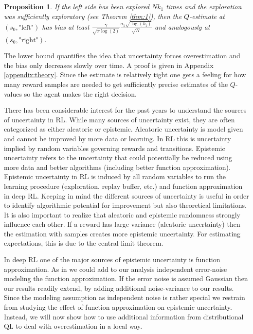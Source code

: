 \documentclass{article}
\theoremstyle{plain}
\newtheorem{proposition}[theorem]{Proposition}
\theoremstyle{definition}
\theoremstyle{remark}
\begin{document}
\begin{proposition}\label{prop2}
If the left side has been explored $Nk_1$ times and the exploration was sufficiently exploratory (see Theorem \ref{thm:1}), then the $Q$-estimate at $(s_0,\text{"left"})$ has bias at least $\frac{\gamma}{\sqrt{\pi\log(2) }}\frac{\sigma_1 \sqrt{\log(k_1)}}{\sqrt{N}}$ and analogously at $(s_0,\text{"right"})$.
\end{proposition}
 The lower bound quantifies the idea that uncertainty forces overestimation and the bias only decreases slowly over time. A proof is given in Appendix \ref{appendix:theory}. Since the estimate is relatively tight one gets a feeling for how many reward samples are needed to get sufficiently precise estimates of the $Q$-values so the agent makes the right decision.

There has been considerable interest for the past years to understand the sources of uncertainty in RL. While many sources of uncertainty exist, they are often categorized as either aleatoric or epistemic. Aleatoric uncertainty is model given and cannot be improved by more data or learning. In RL this is uncertainty implied by random variables governing rewards and transitions. Epistemic uncertainty refers to the uncertainty that could potentially be reduced using more data and better algorithms (including better function approximation). Epistemic uncertainty in RL is induced by all random variables to run the learning procedure (exploration, replay buffer, etc.) and function approximation in deep RL. Keeping in mind the different sources of uncertainty is useful in order to identify algorithmic potential for improvement but also theoretical limitations. It is also important to realize that aleatoric and epistemic randomness strongly influence each other. If a reward has large variance (aleatoric uncertainty) then  the estimation with samples creates more epistemic uncertainty. For estimating expectations, this is due to the central limit theorem. 

In deep RL one of the major sources of epistemic uncertainty is function approximation. As in \cite{Thrun+Schwartz:1993} we could add to our analysis independent error-noise modeling the function approximation. If the error noise is assumed Gaussian then our results readily extend, by adding additional noise-variance to our results. Since the modeling assumption as independent noise is rather special we restrain from studying the effect of function approximation on epistemic uncertainty. Instead, we will now show how to use additional information from distributional QL to deal with overestimation in a local way.
\end{document}
